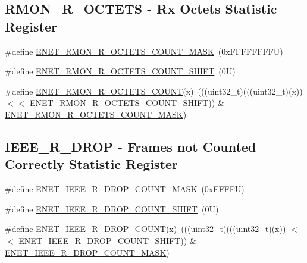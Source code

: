 \subsection*{R\+M\+O\+N\+\_\+\+R\+\_\+\+O\+C\+T\+E\+TS -\/ Rx Octets Statistic Register}
\begin{DoxyCompactItemize}
\item 
\#define \mbox{\hyperlink{group___e_n_e_t___register___masks_ga31948c93e2594b779db5084f7c65a294}{E\+N\+E\+T\+\_\+\+R\+M\+O\+N\+\_\+\+R\+\_\+\+O\+C\+T\+E\+T\+S\+\_\+\+C\+O\+U\+N\+T\+\_\+\+M\+A\+SK}}~(0x\+F\+F\+F\+F\+F\+F\+F\+F\+U)
\item 
\#define \mbox{\hyperlink{group___e_n_e_t___register___masks_ga048e6dcb8662f710b44101a65f6bc6c8}{E\+N\+E\+T\+\_\+\+R\+M\+O\+N\+\_\+\+R\+\_\+\+O\+C\+T\+E\+T\+S\+\_\+\+C\+O\+U\+N\+T\+\_\+\+S\+H\+I\+FT}}~(0\+U)
\item 
\#define \mbox{\hyperlink{group___e_n_e_t___register___masks_ga9c8d0f6539dace79465f4e616914072c}{E\+N\+E\+T\+\_\+\+R\+M\+O\+N\+\_\+\+R\+\_\+\+O\+C\+T\+E\+T\+S\+\_\+\+C\+O\+U\+NT}}(x)~(((uint32\+\_\+t)(((uint32\+\_\+t)(x)) $<$$<$ \mbox{\hyperlink{group___e_n_e_t___register___masks_ga048e6dcb8662f710b44101a65f6bc6c8}{E\+N\+E\+T\+\_\+\+R\+M\+O\+N\+\_\+\+R\+\_\+\+O\+C\+T\+E\+T\+S\+\_\+\+C\+O\+U\+N\+T\+\_\+\+S\+H\+I\+FT}})) \& \mbox{\hyperlink{group___e_n_e_t___register___masks_ga31948c93e2594b779db5084f7c65a294}{E\+N\+E\+T\+\_\+\+R\+M\+O\+N\+\_\+\+R\+\_\+\+O\+C\+T\+E\+T\+S\+\_\+\+C\+O\+U\+N\+T\+\_\+\+M\+A\+SK}})
\end{DoxyCompactItemize}
\subsection*{I\+E\+E\+E\+\_\+\+R\+\_\+\+D\+R\+OP -\/ Frames not Counted Correctly Statistic Register}
\begin{DoxyCompactItemize}
\item 
\#define \mbox{\hyperlink{group___e_n_e_t___register___masks_ga40514ce83587f1cd466ecbe7b007e571}{E\+N\+E\+T\+\_\+\+I\+E\+E\+E\+\_\+\+R\+\_\+\+D\+R\+O\+P\+\_\+\+C\+O\+U\+N\+T\+\_\+\+M\+A\+SK}}~(0x\+F\+F\+F\+F\+U)
\item 
\#define \mbox{\hyperlink{group___e_n_e_t___register___masks_gadfe517b4bb1358a8934a04c3bfe94d9d}{E\+N\+E\+T\+\_\+\+I\+E\+E\+E\+\_\+\+R\+\_\+\+D\+R\+O\+P\+\_\+\+C\+O\+U\+N\+T\+\_\+\+S\+H\+I\+FT}}~(0\+U)
\item 
\#define \mbox{\hyperlink{group___e_n_e_t___register___masks_ga949d161e892827ef0d58e6dc6597885b}{E\+N\+E\+T\+\_\+\+I\+E\+E\+E\+\_\+\+R\+\_\+\+D\+R\+O\+P\+\_\+\+C\+O\+U\+NT}}(x)~(((uint32\+\_\+t)(((uint32\+\_\+t)(x)) $<$$<$ \mbox{\hyperlink{group___e_n_e_t___register___masks_gadfe517b4bb1358a8934a04c3bfe94d9d}{E\+N\+E\+T\+\_\+\+I\+E\+E\+E\+\_\+\+R\+\_\+\+D\+R\+O\+P\+\_\+\+C\+O\+U\+N\+T\+\_\+\+S\+H\+I\+FT}})) \& \mbox{\hyperlink{group___e_n_e_t___register___masks_ga40514ce83587f1cd466ecbe7b007e571}{E\+N\+E\+T\+\_\+\+I\+E\+E\+E\+\_\+\+R\+\_\+\+D\+R\+O\+P\+\_\+\+C\+O\+U\+N\+T\+\_\+\+M\+A\+SK}})
\end{DoxyCompactItemize}
